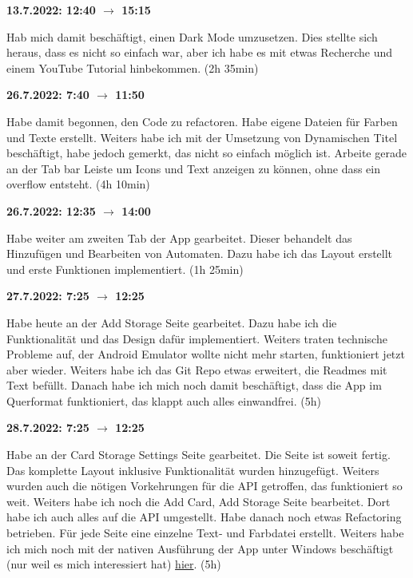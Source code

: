 \vspace{0.5cm}

\textbf{13.7.2022: 12:40 $\rightarrow$ 15:15} \

Hab mich damit beschäftigt, einen Dark Mode umzusetzen. Dies stellte sich heraus, dass es nicht so einfach war, aber ich habe es mit etwas Recherche und einem YouTube Tutorial hinbekommen. (2h 35min)

\vspace{0.5cm}

\textbf{26.7.2022: 7:40 $\rightarrow$ 11:50} \

Habe damit begonnen, den Code zu refactoren. Habe eigene Dateien für Farben und Texte erstellt. Weiters habe ich mit der Umsetzung von Dynamischen Titel beschäftigt, habe jedoch gemerkt, das nicht so einfach möglich ist. Arbeite gerade an der Tab bar Leiste um Icons und Text anzeigen zu können, ohne dass ein overflow entsteht. (4h 10min)

\vspace{0.5cm}

\textbf{26.7.2022: 12:35 $\rightarrow$ 14:00} \

Habe weiter am zweiten Tab der App gearbeitet. Dieser behandelt das Hinzufügen und Bearbeiten von Automaten. Dazu habe ich das Layout erstellt und erste Funktionen implementiert. (1h 25min)

\vspace{0.5cm}

\textbf{27.7.2022: 7:25 $\rightarrow$ 12:25} \

Habe heute an der Add Storage Seite gearbeitet. Dazu habe ich die Funktionalität und das Design dafür implementiert. Weiters traten technische Probleme auf, der Android Emulator wollte nicht mehr starten, funktioniert jetzt aber wieder. Weiters habe ich das Git Repo etwas erweitert, die Readmes mit Text befüllt. Danach habe ich mich noch damit beschäftigt, dass die App im Querformat funktioniert, das klappt auch alles einwandfrei. (5h)

\vspace{0.5cm}

\textbf{28.7.2022: 7:25 $\rightarrow$ 12:25} \

Habe an der Card Storage Settings Seite gearbeitet. Die Seite ist soweit fertig. Das komplette Layout inklusive Funktionalität wurden hinzugefügt. Weiters wurden auch die nötigen Vorkehrungen für die API getroffen, das funktioniert so weit. Weiters habe ich noch die Add Card, Add Storage Seite bearbeitet. Dort habe ich auch alles auf die API umgestellt. Habe danach noch etwas Refactoring betrieben. Für jede Seite eine einzelne Text- und Farbdatei erstellt. Weiters habe ich mich noch mit der nativen Ausführung der App unter Windows beschäftigt (nur weil es mich interessiert hat) \href{https://medium.com/flutter-community/flutter-for-desktop-create-and-run-a-desktop-application-ebeb1604f1e0}{hier}. (5h)

